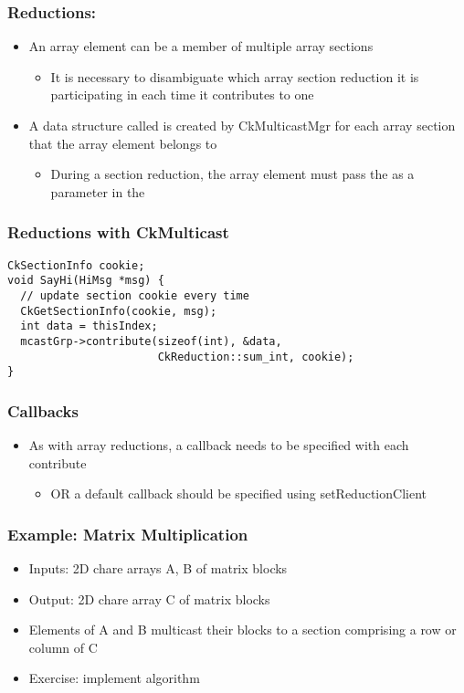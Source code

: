 \begin{frame}[fragile]
\frametitle{Reductions: }
\begin{itemize}
\item An array element can be a member of multiple array sections
  \begin{itemize}
  \item It is necessary to disambiguate which array section reduction it is
    participating in each time it contributes to one
  \end{itemize}
\item A data structure called  is created by CkMulticastMgr
  for each array section that the array element belongs to
  \begin{itemize}
  \item During a section reduction, the array element must pass the
     as a parameter in the 
  \end{itemize}
\end{itemize}
\end{frame}

\begin{frame}[fragile]
\frametitle{Reductions with CkMulticast}
\begin{lstlisting}
CkSectionInfo cookie;
void SayHi(HiMsg *msg) {
  // update section cookie every time
  CkGetSectionInfo(cookie, msg);
  int data = thisIndex;
  mcastGrp->contribute(sizeof(int), &data,
                       CkReduction::sum_int, cookie);
}
\end{lstlisting}
\end{frame}

\begin{frame}[fragile]
\frametitle{Callbacks}
\begin{itemize}
\item As with array reductions, a callback needs to be specified with each
  contribute
  \begin{itemize}
  \item OR a default callback should be specified using setReductionClient
  \end{itemize}
\end{itemize}
\end{frame}

\begin{frame}[fragile]
\frametitle{Example: Matrix Multiplication}
\begin{itemize}
\item Inputs: 2D chare arrays A, B of matrix blocks
\item Output: 2D chare array C of matrix blocks
\item Elements of A and B multicast their blocks to a section comprising a row
  or column of C
\item Exercise: implement algorithm
\end{itemize}
\end{frame}